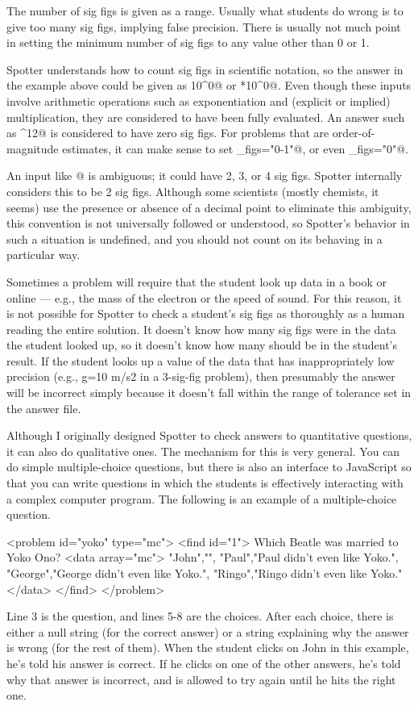 \documentclass{doc}
\begin{document}
The number of sig figs is given as a range. Usually what students do wrong is to give too many
sig figs, implying false precision. There is usually not much point in setting the minimum number
of sig figs to any value other than 0 or 1.

Spotter understands how to count sig figs in scientific notation, so
the answer in the example above could be given as  10^0@ or *10^0@.
Even though these inputs involve arithmetic operations such as exponentiation and
(explicit or implied) multiplication, they are considered to have been fully evaluated.
An answer such as ^12@ is considered to have zero sig figs.
For problems that are order-of-magnitude estimates, it can make sense to set \verb@sig_figs="0-1"@,
or even \verb@sig_figs="0"@.

An input like @ is ambiguous; it could have 2, 3, or 4 sig figs. Spotter internally
considers this to be 2 sig figs. Although some scientists (mostly chemists, it seems) use the presence or absence of a decimal
point to eliminate this ambiguity, this convention is not universally followed or understood, so Spotter's behavior
in such a situation is undefined, and you should not count on its behaving in a particular way.

Sometimes a problem will require that the student look up data in a book or online --- e.g.,
the mass of the electron or the speed of sound. For this reason, it is not possible for
Spotter to check a student's sig figs as thoroughly as a human reading the entire solution.
It doesn't know how many sig figs were in the data the student looked up, so it doesn't
know how many should be in the student's result.
If the student looks up a value of the data that has inappropriately low precision
(e.g., g=10 m/s2 in a 3-sig-fig problem), then presumably the answer will be incorrect
simply because it doesn't fall within the range of tolerance set in the answer file.

\label{qualitative}
Although I originally designed Spotter to check answers to quantitative questions,
it can also do qualitative ones. The mechanism for this is very general. You can
do simple multiple-choice questions, but there is also an interface to JavaScript
so that you can write questions in which the students is effectively interacting
with a complex computer program. The following is an example of a multiple-choice
question.
\begin{listing}{1}
<problem id="yoko" type="mc">
  <find id="1">
    Which Beatle was married to Yoko Ono?
    <data array="mc">
      "John","",
      "Paul","Paul didn't even like Yoko.",
      "George","George didn't even like Yoko.",
      "Ringo","Ringo didn't even like Yoko."
    </data>
  </find>
</problem>
\end{listing}
Line 3 is the question, and lines 5-8 are the choices. After each choice,
there is either a null string (for the correct answer) or a string explaining
why the answer is wrong (for the rest of them). When the student clicks on
John in this example, he's told his answer is correct. If he clicks on one
of the other answers, he's told why that answer is incorrect, and is allowed
to try again until he hits the right one.
\end{document}
